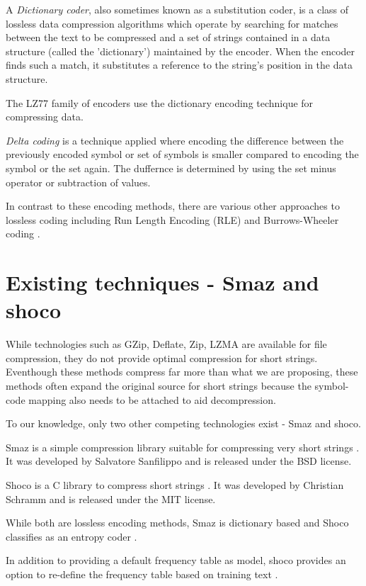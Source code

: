 \documentclass[]{article}
\begin{document}
A \emph{Dictionary coder}, also sometimes known as a substitution coder, is a class of lossless data compression algorithms which operate by searching for matches between the text to be compressed and a set of strings contained in a data structure (called the 'dictionary') maintained by the encoder. When the encoder finds such a match, it substitutes a reference to the string's position in the data structure.

The LZ77 family of encoders use the dictionary encoding technique for compressing data. \cite{4}

\emph{Delta coding} is a technique applied where encoding the difference between the previously encoded symbol or set of symbols is smaller compared to encoding the symbol or the set again.  The duffernce is determined by using the set minus operator or subtraction of values. \cite{5}

In contrast to these encoding methods, there are various other approaches to lossless coding including Run Length Encoding (RLE) and Burrows-Wheeler coding \cite{6}.

\section{Existing techniques - Smaz and shoco}

While technologies such as GZip, Deflate, Zip, LZMA are available for file compression, they do not provide optimal compression for short strings.  Eventhough these methods compress far more than what we are proposing, these methods often expand the original source for short strings because the symbol-code mapping also needs to be attached to aid decompression.

To our knowledge, only two other competing technologies exist - Smaz and shoco.

Smaz is a simple compression library suitable for compressing very short strings \cite{10}. It was developed by Salvatore Sanfilippo and is released under the BSD license.

Shoco is a C library to compress short strings \cite{11}. It was developed by Christian Schramm and is released under the MIT license.

While both are lossless encoding methods, Smaz is dictionary based and Shoco classifies as an entropy coder \cite{11}.

In addition to providing a default frequency table as model, shoco provides an option to re-define the frequency table based on training text \cite{11}.
\end{document}
